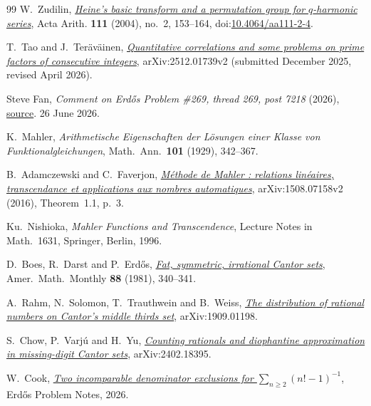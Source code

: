 \documentclass[11pt]{article}
\begin{document}
\begin{thebibliography}{99}
 W.~Zudilin,
  \href{https://geodesic.mathdoc.fr/articles/10.4064/aa111-2-4/}{\emph{Heine's
  basic transform and a permutation group for \(q\)-harmonic series}},
  Acta Arith. \textbf{111} (2004), no.~2, 153--164,
  doi:\href{https://doi.org/10.4064/aa111-2-4}{10.4064/aa111-2-4}.

 T.~Tao and J.~Ter\"av\"ainen,
  \href{https://arxiv.org/abs/2512.01739v2}{\emph{Quantitative correlations and
  some problems on prime factors of consecutive integers}}, arXiv:2512.01739v2
  (submitted December 2025, revised April 2026).

 Steve Fan,
  \emph{Comment on Erd\H{o}s Problem \#269, thread 269, post 7218} (2026),
  \href{https://www.erdosproblems.com/forum/thread/269#post-7218}{source}. 26 June 2026.

 K.~Mahler, \emph{Arithmetische Eigenschaften der L\"osungen
  einer Klasse von Funktionalgleichungen}, Math.\ Ann.\ \textbf{101} (1929),
  342--367.

 B.~Adamczewski and C.~Faverjon,
  \href{https://arxiv.org/abs/1508.07158v2}{\emph{M\'ethode de Mahler : relations
  lin\'eaires, transcendance et applications aux nombres automatiques}},
  arXiv:1508.07158v2 (2016), Theorem~1.1, p.~3.

 Ku.~Nishioka, \emph{Mahler Functions and Transcendence},
  Lecture Notes in Math.\ 1631, Springer, Berlin, 1996.

 D.~Boes, R.~Darst and P.~Erd\H{o}s,
  \href{https://www.tandfonline.com/doi/abs/10.1080/00029890.1981.11995266}{\emph{Fat,
  symmetric, irrational Cantor sets}}, Amer.\ Math.\ Monthly \textbf{88} (1981),
  340--341.

 A.~Rahm, N.~Solomon, T.~Trauthwein and B.~Weiss,
  \href{https://arxiv.org/abs/1909.01198}{\emph{The distribution of rational
  numbers on Cantor's middle thirds set}}, arXiv:1909.01198.

 S.~Chow, P.~Varj\'u and H.~Yu,
  \href{https://arxiv.org/abs/2402.18395}{\emph{Counting rationals and
  diophantine approximation in missing-digit Cantor sets}}, arXiv:2402.18395.

 W.~Cook,
  \href{erdos-68-factorial-denominator-irrationality.pdf}{\emph{Two
  incomparable denominator exclusions for $\sum_{n\ge2}(n!-1)^{-1}$}},
  Erd\H{o}s Problem Notes, 2026.


\end{thebibliography}
\end{document}
